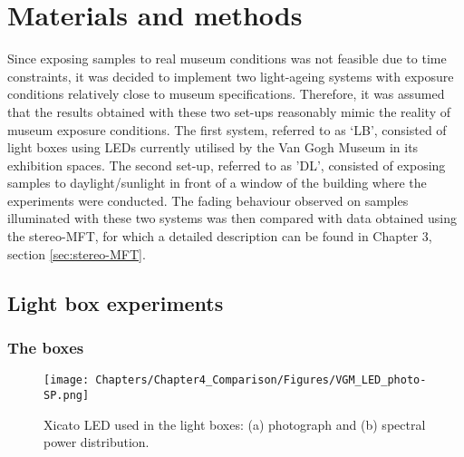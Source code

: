 \section{Materials and methods}

Since exposing samples to real museum conditions was not feasible due to time constraints, it was decided to implement two light-ageing systems with exposure conditions relatively close to museum specifications. Therefore, it was assumed that the results obtained with these two set-ups reasonably mimic the reality of museum exposure conditions. The first system, referred to as ‘\gls{LB}’, consisted of light boxes using LEDs currently utilised by the Van Gogh Museum in its exhibition spaces. The second set-up, referred to as '\gls{DL}', consisted of exposing samples to daylight/sunlight in front of a window of the building where the experiments were conducted. The fading behaviour observed on samples illuminated with these two systems was then compared with data obtained using the stereo-MFT, for which a detailed description can be found in Chapter 3, section \ref{sec:stereo-MFT}.\\


\subsection{Light box experiments}

\subsubsection{The boxes}
\label{chap: LB_boxes}


\begin{figure*}[!h]
\centering
\texttt{[image: Chapters/Chapter4\_Comparison/Figures/VGM\_LED\_photo-SP.png]}
\caption[\hspace{0.3cm}Xicato LED used in the light boxes]{Xicato LED used in the light boxes: (a) photograph and (b) spectral power distribution.}
\label{fig:LB_VGM_LED}
\end{figure*}

